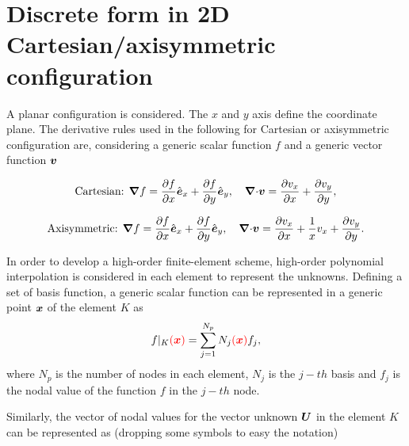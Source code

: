 \documentclass[a4paper,10pt]{article}
\newcommand{\bm}[1]{\text{\boldmath$#1$\unboldmath}}
\newcommand{\parti}[2]{\frac{\partial #1}{\partial #2}}
\newcommand{\Div}{{\bm{\nabla}\cdot}}
\newcommand{\Grad}{\bm{\nabla}}
\newcommand{\DiscFunc}[1]{\bm{#1}}
\renewcommand{\u}{\DiscFunc{U}}
\newcommand{\fo}[1]{{ \color{red} ( #1 )\color{black} }} %
\begin{document}
\clearpage



\section{Discrete form in 2D Cartesian/axisymmetric configuration}
A planar configuration is considered. The $x$ and $y$ axis define the coordinate plane. The derivative rules used in the following for Cartesian or axisymmetric configuration are, considering a generic scalar function $f$ and a generic vector function $\bm{v}$

\[
 \text{Cartesian:  } \Grad f = \parti{f}{x} \hat{\bm{e}}_x + \parti{f}{y} \hat{\bm{e}}_y,\quad \Div \bm{v} = \parti{v_x}{x} +\parti{v_y}{y},
\]

\[
 \text{Axisymmetric:  } \Grad f = \parti{f}{x} \hat{\bm{e}}_x + \parti{f}{y} \hat{\bm{e}}_y,\quad \Div \bm{v} = \parti{v_x}{x}+\frac{1}{x} v_x +\parti{v_y}{y}.
\]

In order to develop a high-order finite-element scheme, high-order polynomial interpolation is considered in each element to represent the unknowns. Defining a set of basis function, a generic scalar function can be represented in a generic point $\bm{x}$ of the element $K$ as
\[
 f|_{K}\fo{\bm{x}} = \sum_{j=1}^{N_p} N_j\fo{\bm{x}} f_j,
\]
where $N_p$ is the number of nodes in each element, $N_j$ is the $j-th$ basis and $f_j$ is the nodal value of the function $f$ in the $j-th$ node.

Similarly, the vector of nodal values for the vector unknown $\u$ in the element $K$ can be represented as (dropping some symbols to easy the notation) 
\end{document}
